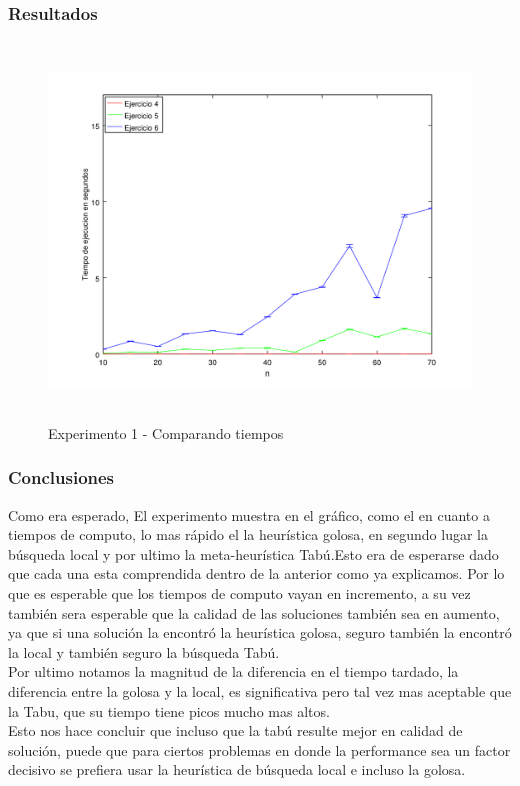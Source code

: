 \subsubsection*{Resultados}\;
    \begin{figure}[H]
      \includegraphics[height=10cm]{graficos/ejercicio7-exp1-tiempos.png}
       \caption{Experimento 1 - Comparando tiempos}
	\end{figure}

\subsubsection*{Conclusiones}\;
Como era esperado, El experimento muestra en el gráfico, como el en cuanto a tiempos de computo, lo mas rápido el la heurística golosa, en segundo lugar la búsqueda local y por ultimo la meta-heurística Tabú.Esto era de esperarse dado que cada una esta comprendida dentro de la anterior como ya explicamos. Por lo que es esperable que los tiempos de computo vayan en incremento, a su vez también sera esperable que la calidad de las soluciones también sea en aumento, ya que si una solución la encontró la heurística golosa, seguro también la encontró la local y también seguro la búsqueda Tabú.\\
Por ultimo notamos la magnitud de la diferencia en el tiempo tardado, la diferencia entre la golosa y la local, es significativa pero tal vez mas aceptable que la Tabu, que su tiempo tiene picos mucho mas altos.\\
Esto nos hace concluir que incluso que la tabú resulte mejor en calidad de solución, puede que para ciertos problemas en donde la performance sea un factor decisivo se prefiera usar la heurística de búsqueda local e incluso la golosa.

